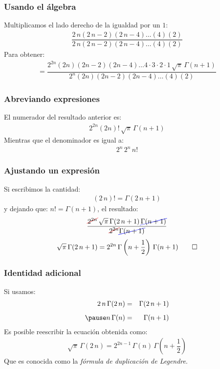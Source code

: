 \documentclass[12pt]{beamer}
\begin{document}
\begin{frame}[fragile]
\frametitle{Usando el álgebra}
Multiplicamos el lado derecho de la igualdad por un $1$:
\begin{align*}
\dfrac{2 \, n (2 \, n - 2)(2 \, n - 4) \ldots (4)(2)}{2 \, n (2 \, n - 2)(2 \, n - 4) \ldots (4)(2)}
\end{align*}
\pause
Para obtener:
\begin{align*}
= \dfrac{2^{2n} (2 n) (2 n {-} 2)(2 n {-} 4) \ldots 4 \cdot 3 \cdot 2 \cdot 1 \, \sqrt{\pi} \, \Gamma(n {+} 1)}{2^{n} (2 n)(2 n {-} 2)(2 n {-} 4) \ldots (4) (2)}
\end{align*}
\pause
{}
\end{frame}
\begin{frame}
\frametitle{Abreviando expresiones}
El numerador del resultado anterior es:
\pause
\begin{align*}
2^{2n} (2 n)! \, \sqrt{\pi} \, \Gamma(n + 1)
\end{align*}
\pause
Mientras que el denominador es igual a:
\begin{align*}
2^{n} \, 2^{n} \, n!
\end{align*}
\end{frame}
\begin{frame}
\frametitle{Ajustando un expresión}
Si escribimos la cantidad:
\pause
\begin{align*}
(2 \, n)! = \Gamma(2 \, n + 1)
\end{align*}
\pause
y dejando que: $n! = \Gamma(n + 1)$, el resultado:
\pause
\begin{align*}
\dfrac{\Cancel[red]{2^{2n}} \, \sqrt{\pi} \, \Gamma(2 \, n + 1) \, \Cancel[blue]{\Gamma(n + 1)}}{\Cancel[red]{2^{2n}} \Cancel[blue]{\Gamma(n + 1)}}
\end{align*}
\pause
\begin{align*}
\sqrt{\pi} \, \Gamma(2 \, n + 1) = 2^{2n} \, \Gamma \left( n + \dfrac{1}{2} \right) \, \Gamma(n + 1) \qed
\end{align*}    
\end{frame}
\begin{frame}
\frametitle{Identidad adicional}
Si usamos:
\pause
\begin{eqnarray*}
2 \, n \, \Gamma( 2 \, n) &=& \Gamma(2 \, n + 1) \\[0.5em] \pause
n \, \Gamma(n) &=& \Gamma(n + 1)
\end{eqnarray*}
\pause
Es posible reescribir la ecuación obtenida como:
\begin{align*}
\sqrt{\pi} \, \Gamma(2 \, n) = 2^{2n-1} \, \Gamma(n) \, \Gamma \left( n + \dfrac{1}{2} \right)
\end{align*}
\pause
Que es conocida como la \emph{fórmula de duplicación de Legendre}.
\end{frame}
\end{document}
